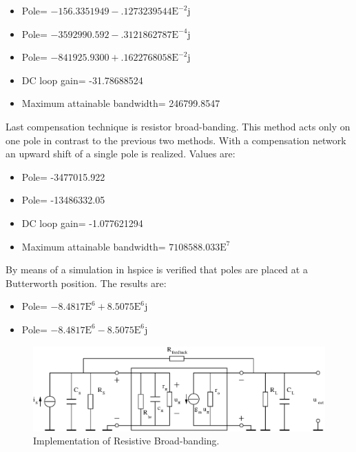 \documentclass[conference]{IEEEtran}
\begin{document}
\begin{itemize}
\item Pole= $-156.3351949-.1273239544\text{E}^{-2}\text{j}$
\item Pole= $-3592990.592-.3121862787\text{E}^{-4}\text{j}$
\item Pole= $-841925.9300+.1622768058\text{E}^{-2}\text{j}$
\item DC loop gain= -31.78688524
\item Maximum attainable bandwidth= 246799.8547
\end{itemize}


Last compensation technique is resistor broad-banding. This method acts only on one pole in contrast to the previous two methods. With a compensation network an upward shift of a single pole is realized. Values are:

\begin{itemize}
\item Pole= -3477015.922
\item Pole= -13486332.05
\item DC loop gain= -1.077621294
\item Maximum attainable bandwidth= $7108588.033\text{E}^7$
\end{itemize}


By means of a simulation in hspice \cite{hspice} is verified that poles are placed at a Butterworth position. The results are:

\begin{itemize}
\item Pole= $-8.4817\text{E}^6+8.5075\text{E}^6\text{j}$
\item Pole= $-8.4817\text{E}^6-8.5075\text{E}^6\text{j}$
\end{itemize}


\begin{figure}[hbtp]
	\centering
	\includegraphics[scale=.45]{figures/transimp_3.eps}
	\caption{Implementation of Resistive Broad-banding.}
	\label{fig:transimp_3}
\end{figure}
\end{document}
